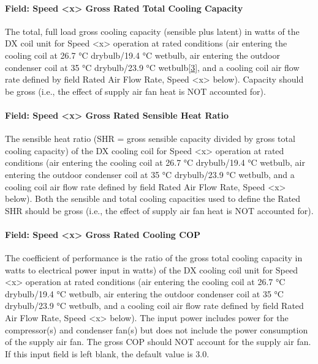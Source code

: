 \paragraph{Field: Speed \textless{}x\textgreater{} Gross Rated Total Cooling Capacity}\label{field-speed-x-gross-rated-total-cooling-capacity}

The total, full load gross cooling capacity (sensible plus latent) in watts of the DX coil unit for Speed \textless{}x\textgreater{} operation at rated conditions (air entering the cooling coil at 26.7 °C drybulb/19.4 °C wetbulb, air entering the outdoor condenser coil at 35 °C drybulb/23.9 °C wetbulb\protect\hyperlink{ux5fftn3}{{[}3{]}}, and a cooling coil air flow rate defined by field Rated Air Flow Rate, Speed \textless{}x\textgreater{} below). Capacity should be gross (i.e., the effect of supply air fan heat is NOT accounted for).

\paragraph{Field: Speed \textless{}x\textgreater{} Gross Rated Sensible Heat Ratio}\label{field-speed-x-gross-rated-sensible-heat-ratio}

The sensible heat ratio (SHR = gross sensible capacity divided by gross total cooling capacity) of the DX cooling coil for Speed \textless{}x\textgreater{} operation at rated conditions (air entering the cooling coil at 26.7 °C drybulb/19.4 °C wetbulb, air entering the outdoor condenser coil at 35 °C drybulb/23.9 °C wetbulb, and a cooling coil air flow rate defined by field Rated Air Flow Rate, Speed \textless{}x\textgreater{} below). Both the sensible and total cooling capacities used to define the Rated SHR should be gross (i.e., the effect of supply air fan heat is NOT accounted for).

\paragraph{Field: Speed \textless{}x\textgreater{} Gross Rated Cooling COP}\label{field-speed-x-gross-rated-cooling-cop}

The coefficient of performance is the ratio of the gross total cooling capacity in watts to electrical power input in watts) of the DX cooling coil unit for Speed \textless{}x\textgreater{} operation at rated conditions (air entering the cooling coil at 26.7 °C drybulb/19.4 °C wetbulb, air entering the outdoor condenser coil at 35 °C drybulb/23.9 °C wetbulb, and a cooling coil air flow rate defined by field Rated Air Flow Rate, Speed \textless{}x\textgreater{} below). The input power includes power for the compressor(s) and condenser fan(s) but does not include the power consumption of the supply air fan. The gross COP should NOT account for the supply air fan. If this input field is left blank, the default value is 3.0.

